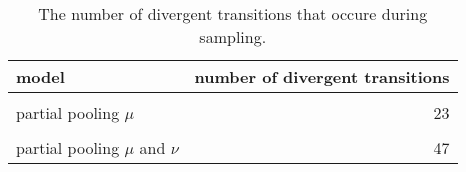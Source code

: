 \begin{table}
\centering
\caption{\label{tab:n_divergent}The number of divergent transitions that occure during sampling.}
\centering
\begin{tabular}[t]{lr}
\toprule
model & number of divergent transitions\\
\midrule
\cellcolor{gray!10}{complete pooling} & \cellcolor{gray!10}{0}\\
partial pooling $\mu$ & 23\\
\cellcolor{gray!10}{partial pooling $\nu$} & \cellcolor{gray!10}{64}\\
partial pooling $\mu$ and $\nu$ & 47\\
\bottomrule
\end{tabular}
\end{table}
